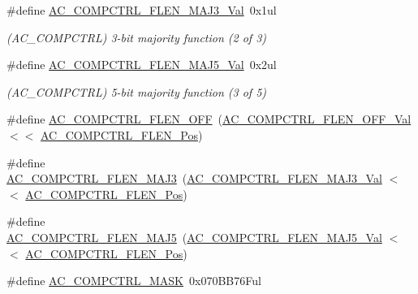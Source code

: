 \begin{DoxyCompactItemize}
\#define \mbox{\hyperlink{group___s_a_m_d21___a_c_ga7e847b79ecfd83187149193ecaead562}{A\+C\+\_\+\+C\+O\+M\+P\+C\+T\+R\+L\+\_\+\+F\+L\+E\+N\+\_\+\+M\+A\+J3\+\_\+\+Val}}~0x1ul
\begin{DoxyCompactList}\small\item\em (A\+C\+\_\+\+C\+O\+M\+P\+C\+T\+RL) 3-\/bit majority function (2 of 3) \end{DoxyCompactList}\item 
\#define \mbox{\hyperlink{group___s_a_m_d21___a_c_gaaf4628cdfeb3c447df3cab7adf2665a8}{A\+C\+\_\+\+C\+O\+M\+P\+C\+T\+R\+L\+\_\+\+F\+L\+E\+N\+\_\+\+M\+A\+J5\+\_\+\+Val}}~0x2ul
\begin{DoxyCompactList}\small\item\em (A\+C\+\_\+\+C\+O\+M\+P\+C\+T\+RL) 5-\/bit majority function (3 of 5) \end{DoxyCompactList}\item 
\#define \mbox{\hyperlink{group___s_a_m_d21___a_c_ga0f010ce2ce3945d6d36ac829c151890f}{A\+C\+\_\+\+C\+O\+M\+P\+C\+T\+R\+L\+\_\+\+F\+L\+E\+N\+\_\+\+O\+FF}}~(\mbox{\hyperlink{group___s_a_m_d21___a_c_ga724ff78f629c59a482f3318c76dca04e}{A\+C\+\_\+\+C\+O\+M\+P\+C\+T\+R\+L\+\_\+\+F\+L\+E\+N\+\_\+\+O\+F\+F\+\_\+\+Val}}      $<$$<$ \mbox{\hyperlink{group___s_a_m_d21___a_c_ga66181eff5fbbb90049f3aae3b27b5a62}{A\+C\+\_\+\+C\+O\+M\+P\+C\+T\+R\+L\+\_\+\+F\+L\+E\+N\+\_\+\+Pos}})
\item 
\#define \mbox{\hyperlink{group___s_a_m_d21___a_c_ga23b071c0451d67ea280455fd8e64ce50}{A\+C\+\_\+\+C\+O\+M\+P\+C\+T\+R\+L\+\_\+\+F\+L\+E\+N\+\_\+\+M\+A\+J3}}~(\mbox{\hyperlink{group___s_a_m_d21___a_c_ga7e847b79ecfd83187149193ecaead562}{A\+C\+\_\+\+C\+O\+M\+P\+C\+T\+R\+L\+\_\+\+F\+L\+E\+N\+\_\+\+M\+A\+J3\+\_\+\+Val}}     $<$$<$ \mbox{\hyperlink{group___s_a_m_d21___a_c_ga66181eff5fbbb90049f3aae3b27b5a62}{A\+C\+\_\+\+C\+O\+M\+P\+C\+T\+R\+L\+\_\+\+F\+L\+E\+N\+\_\+\+Pos}})
\item 
\#define \mbox{\hyperlink{group___s_a_m_d21___a_c_ga084aaecc35c3639095c3353e4903a530}{A\+C\+\_\+\+C\+O\+M\+P\+C\+T\+R\+L\+\_\+\+F\+L\+E\+N\+\_\+\+M\+A\+J5}}~(\mbox{\hyperlink{group___s_a_m_d21___a_c_gaaf4628cdfeb3c447df3cab7adf2665a8}{A\+C\+\_\+\+C\+O\+M\+P\+C\+T\+R\+L\+\_\+\+F\+L\+E\+N\+\_\+\+M\+A\+J5\+\_\+\+Val}}     $<$$<$ \mbox{\hyperlink{group___s_a_m_d21___a_c_ga66181eff5fbbb90049f3aae3b27b5a62}{A\+C\+\_\+\+C\+O\+M\+P\+C\+T\+R\+L\+\_\+\+F\+L\+E\+N\+\_\+\+Pos}})
\item 
\#define \mbox{\hyperlink{group___s_a_m_d21___a_c_ga485a4ac9ac9bea7b8d650fed87e02230}{A\+C\+\_\+\+C\+O\+M\+P\+C\+T\+R\+L\+\_\+\+M\+A\+SK}}~0x070\+B\+B76\+Ful
$$
\end{DoxyCompactItemize}
